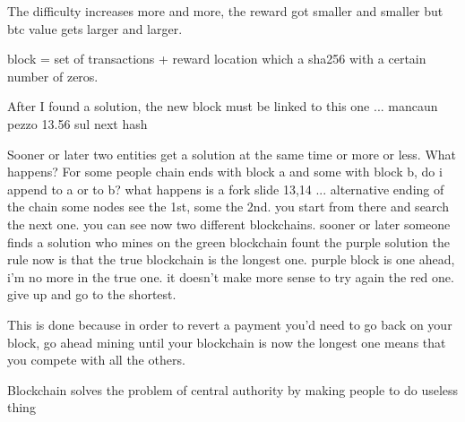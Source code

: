                     The difficulty increases more and more, the reward got smaller and smaller but btc value gets larger and larger.

                    block = set of transactions + reward location which a sha256 with a certain number of zeros.

                    After I found a solution, the new block must be linked to this one ... mancaun pezzo 13.56 sul next hash 


                    Sooner or later two entities get a solution at the same time or more or less. What happens?
                    For some people chain ends with block a and some with block b, do i append to a or to b?
                        what happens is a fork
                        slide 13,14 ...  
                            alternative ending of the chain
                            some nodes see the 1st, some the 2nd.
                            you start from there and search the next one.
                            you can see now two different blockchains.
                            sooner or later someone finds a solution
                                who mines on the green blockchain fount the purple solution
                                    the rule now is that the true blockchain is the longest one.
                                        purple block is one ahead, i'm no more in the true one. 
                                        it doesn't make more sense to try again the red one.
                                        give up and go to the shortest.
                                    
                            This is done because in order to revert a payment you'd need to go back on your block, go ahead mining until your blockchain is now the longest one
                            means that you compete with all the others.

                            Blockchain solves the problem of central authority by making people to do useless thing 



    \iffalse

\fi
